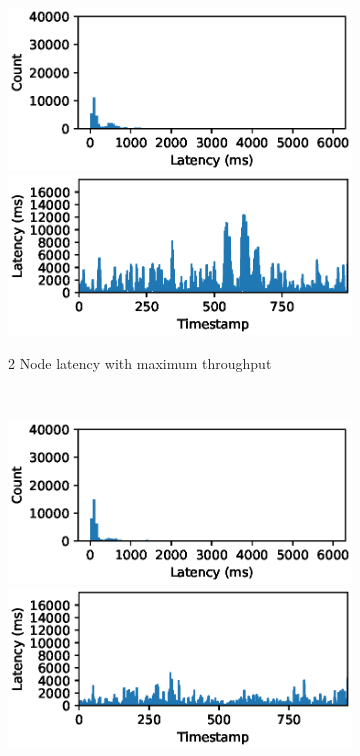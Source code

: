 \begin{figure}
    \centering
    \begin{subfigure}[b]{0.3\textwidth}
        \includegraphics[width=\textwidth]{eps/flink_agg_2node_th_max_hist}
         \includegraphics[width=\textwidth]{eps/flink_agg_2node_th_max_ts}

        \caption{2 Node latency with maximum throughput}
    \end{subfigure}
    ~ 
    \begin{subfigure}[b]{0.3\textwidth}
        \includegraphics[width=\textwidth]{eps/flink_agg_4node_th_max_hist}
         \includegraphics[width=\textwidth]{eps/flink_agg_4node_th_max_ts}


\end{subfigure}
\end{figure}
